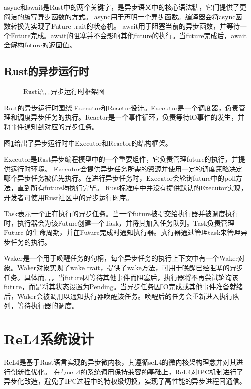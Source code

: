 async和await是Rust中的两个关键字，是异步语义中的核心语法糖，它们提供了更简洁的编写异步函数的方式。
async用于声明一个异步函数。编译器会将async函数转换为实现了Future trait的状态机。
await用于阻塞当前的异步函数，并等待一个Future完成。await的阻塞并不会影响其他future的执行。当future完成后，await会解构future的返回值。


\subsection{Rust的异步运行时}

\begin{figure}[htbp]
    \centering
    
    \caption{Rust语言异步运行时框架图}\label{asyncruntime}
\end{figure}

Rust的异步运行时围绕 Executor和Reactor设计。Executor是一个调度器，负责管理和调度异步任务的执行。Reactor是一个事件循环，负责等待IO事件的发生，并将事件通知到对应的异步任务。

图\ref{asyncruntime}给出了异步运行时中Executor和Reactor的结构框架。

Executor是Rust异步编程模型中的一个重要组件，它负责管理future的执行，并提供运行时环境。
Executor会提供异步任务所需的资源并使用一定的调度策略决定哪个异步任务被优先执行。在进行异步任务时，Executor会轮询future中的poll方法，直到所有future均执行完毕。
Rust标准库中并没有提供默认的Executor实现，开发者可使用Rust社区中的异步运行时库。

Task表示一个正在执行的异步任务。当一个future被提交给执行器并被调度执行时，执行器会为该Future创建一个Task，并将其加入任务队列。Task负责管理 Future 的生命周期，并在Future完成时通知执行器。执行器通过管理task来管理异步任务的执行。

Waker是一个用于唤醒任务的句柄，每个异步任务的执行上下文中有一个Waker对象。Waker对象实现了wake trait，提供了wake方法，可用于唤醒已经阻塞的异步任务。具体而言，当future因等待其他事件而阻塞后，执行器将不再尝试轮询该future，而是将其状态设置为Pending。当异步任务因IO完成或其他事件准备就绪后，Waker会被调用以通知执行器唤醒该任务。唤醒后的任务会重新进入执行队列，等待执行器的调度。

\section{ReL4系统设计}

ReL4是基于Rust语言实现的异步微内核，其遵循seL4的微内核架构理念并对其进行创新性优化。
在与seL4的系统调用保持兼容的基础上，ReL4对IPC机制进行了异步化改造，避免了IPC过程中的特权级切换，实现了高性能的异步进程间通信。

